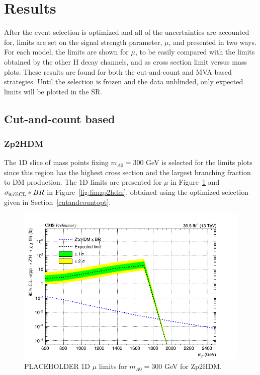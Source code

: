 \section{Results}

After the event selection is optimized and all of the uncertainties are accounted for, limits are set on the signal strength parameter, $\mu$, and presented in two ways. For each model, the limits are shown for $\mu$, to be easily compared with the limits obtained by the other H decay channels, and as cross section limit versus mass plots. These results are found for both the cut-and-count and MVA based strategies. Until the selection is frozen and the data unblinded, only expected limits will be plotted in the SR.

\subsection{Cut-and-count based}

\subsubsection{Zp2HDM}

The 1D slice of mass points fixing $m_{A0} = 300$ GeV is selected for the limits plots since this region has the highest cross section and the largest branching fraction to DM production. The 1D limits are presented for $\mu$ in Figure~\ref{fig:limzp2hdmmu} and $\sigma_{95\% \rm{CL}}*BR$ in Figure~\ref{fig:limzp2hdm}, obtained using the optimized selection given in Section~\ref{cutandcountopt}.  

\begin{figure}[tbh]
\centering
\includegraphics[width=5in]{figures/sigma_limits_4mu_Zp2HDM.png}
\caption{PLACEHOLDER 1D $\mu$ limits for $m_{A0} = 300$ GeV for Zp2HDM.}
\label{fig:limzp2hdmmu}
\end{figure}

